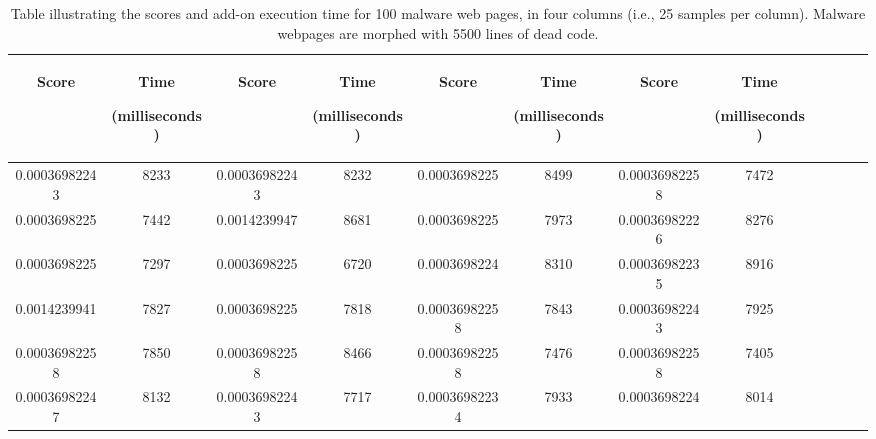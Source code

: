 \begin{table}[h]
\caption[Scores table of malware web pages]{Table illustrating the scores and add-on execution time for 100 malware web pages, in four columns (i.e., 25 samples per column). Malware webpages are morphed with 5500 lines of dead code. }
    \label{tab:m5500table}
  \centering
  \begin{tabular}{|c|c|c|c|c|c|c|c|c|c|c|c|} 
  \midrule
 \begin{sideways}Score\end{sideways}& \begin{sideways}Time\end{sideways} \begin{sideways} (milliseconds)\end{sideways}& \begin{sideways}Score\end{sideways}& \begin{sideways}Time\end{sideways}  \begin{sideways}(milliseconds)\end{sideways}& \begin{sideways}Score\end{sideways}& \begin{sideways}Time\end{sideways}  \begin{sideways}(milliseconds)\end{sideways}& \begin{sideways}Score\end{sideways}& \begin{sideways}Time\end{sideways}  \begin{sideways} (milliseconds)\end{sideways}\\
\midrule
0.00036982243&8233&0.00036982243&8232&0.0003698225&8499&0.00036982258&7472\\
\midrule
0.0003698225&7442&0.0014239947&8681&0.0003698225&7973&0.00036982226&8276\\
\midrule
0.0003698225&7297&0.0003698225&6720&0.0003698224&8310&0.00036982235&8916\\
\midrule
0.0014239941&7827&0.0003698225&7818&0.00036982258&7843&0.00036982243&7925\\
\midrule
0.00036982258&7850&0.00036982258&8466&0.00036982258&7476&0.00036982258&7405\\
\midrule
0.00036982247&8132&0.00036982243&7717&0.00036982234&7933&0.0003698224&8014\\

\end{tabular}
\end{table}
